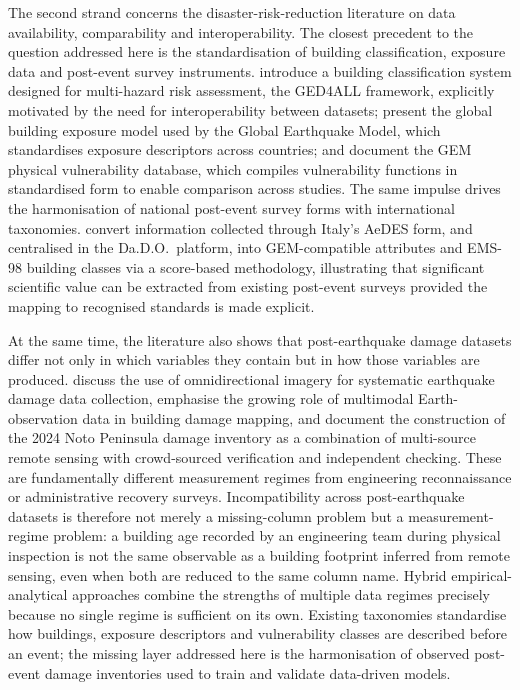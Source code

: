 \documentclass[11pt,a4paper]{article}
\begin{document}
The second strand concerns the disaster-risk-reduction literature on data availability, comparability and interoperability. The closest precedent to the question addressed here is the standardisation of building classification, exposure data and post-event survey instruments. \citet{silva2022buildingclass} introduce a building classification system designed for multi-hazard risk assessment, the GED4ALL framework, explicitly motivated by the need for interoperability between datasets; \citet{yepes2023exposure} present the global building exposure model used by the Global Earthquake Model, which standardises exposure descriptors across countries; and \citet{yepes2016vulnerability} document the GEM physical vulnerability database, which compiles vulnerability functions in standardised form to enable comparison across studies. The same impulse drives the harmonisation of national post-event survey forms with international taxonomies. \citet{rosti2021aedes} convert information collected through Italy's AeDES form, and centralised in the Da.D.O.\ platform, into GEM-compatible attributes and EMS-98 building classes via a score-based methodology, illustrating that significant scientific value can be extracted from existing
post-event surveys provided the mapping to recognised standards is made explicit.

At the same time, the literature also shows that post-earthquake damage datasets differ not only in which variables they contain but in how those variables are produced. \citet{stone2018omnidirectional} discuss the use of omnidirectional imagery for systematic earthquake damage data collection, \citet{adriano2021multimodal} emphasise the growing role of multimodal Earth-observation data in building damage mapping, and \citet{vescovo2025noto} document the construction of the 2024 Noto Peninsula damage inventory as a combination of multi-source remote sensing with crowd-sourced verification and independent checking. These are fundamentally different measurement regimes from engineering reconnaissance or administrative recovery surveys. Incompatibility across post-earthquake datasets is therefore not merely a missing-column problem but a measurement-regime problem: a building age recorded by an engineering team during physical inspection is not the same observable as a building footprint inferred from remote sensing, even when both are reduced to the same column name. Hybrid empirical-analytical approaches \citep{noh2015hybrid} combine the strengths of multiple data regimes precisely because no single regime is sufficient on its own. Existing taxonomies standardise how buildings, exposure descriptors and vulnerability classes are described before an event; the missing layer addressed here is the harmonisation of observed post-event damage inventories used to train and validate data-driven models.
\end{document}
